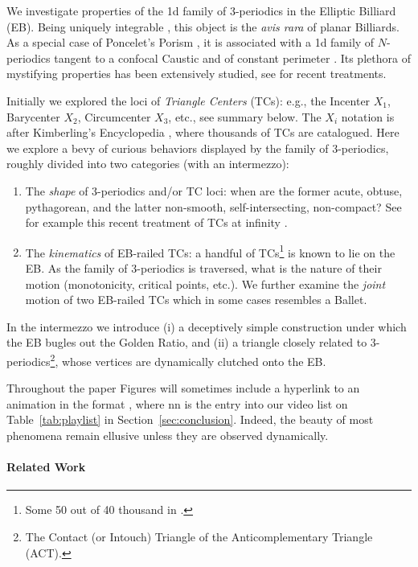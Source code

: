 We investigate properties of the 1d family of 3-periodics in the Elliptic Billiard (EB). Being uniquely integrable \cite{kaloshin2018}, this object is the {\em avis rara} of planar Billiards. As a special case of Poncelet's Porism \cite{dragovic88}, it is associated with a 1d family of $N$-periodics tangent to a confocal Caustic and of constant perimeter \cite{sergei91}. Its plethora of mystifying properties has been extensively studied, see \cite{rozikov2018-billiards,stachel2016-conics} for recent treatments.

Initially we explored the loci of {\em Triangle Centers} (TCs): e.g., the Incenter $X_1$, Barycenter $X_2$, Circumcenter $X_3$, etc., see summary below. The $X_i$ notation is after  Kimberling's Encyclopedia \cite{etc}, where thousands of TCs are catalogued. Here we explore a bevy of curious behaviors displayed by the  family of 3-periodics, roughly divided into two categories (with an intermezzo):

\begin{enumerate}
    \item The {\em shape} of 3-periodics and/or TC loci: when are the former acute, obtuse, pythagorean, and the latter non-smooth, self-intersecting, non-compact? See for example this recent treatment of TCs at infinity  \cite{kimberling2020-poly-infinity}.
    \item The {\em kinematics} of EB-railed TCs: a handful of TCs\footnote{Some 50 out of 40 thousand in \cite{etc}.} is known to lie on the EB. As the family of 3-periodics is traversed, what is the nature of their motion (monotonicity, critical points, etc.). We further examine the {\em joint} motion of two EB-railed TCs which in some cases resembles a Ballet.
\end{enumerate}

In the intermezzo we introduce (i) a deceptively simple construction under which the EB bugles out the Golden Ratio, and (ii) a triangle closely related to 3-periodics\footnote{The Contact (or Intouch) Triangle of the Anticomplementary Triangle (ACT).}, whose vertices are dynamically clutched onto the EB.

Throughout the paper Figures will sometimes include a hyperlink to an animation in the format \cite[PL\#nn]{reznik2020-playlist-intriguing}, where nn is the entry into our video list on Table~\ref{tab:playlist} in Section~\ref{sec:conclusion}. Indeed, the beauty of most phenomena remain ellusive unless they are observed dynamically.

\paragraph{Related Work}


